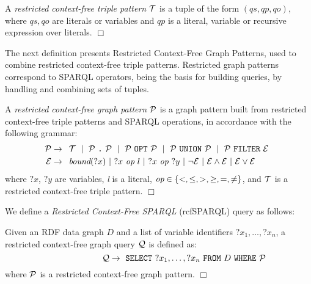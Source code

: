 \documentclass[runningheads]{llncs}
\begin{document}
\begin{definition}
A \textit{restricted con\-text-free triple pattern} ${\cal T}$ is a tuple of the form $(qs, qp, qo)$, where $qs, qo$ are literals or variables and $qp$ is a literal, variable or recursive expression over literals.
\hfill$\Box$
\end{definition}

The next definition presents Restricted Context-Free Graph Patterns, used to combine restricted context-free triple patterns.
Restricted graph patterns correspond to SPARQL operators, being the basis for building queries, by handling and combining sets of tuples.

\begin{definition}
A \textit{restricted con\-text-free graph pattern} ${\cal P}$ is a graph pattern built from restricted context-free triple patterns and SPARQL operations, in accordance with the following grammar:
\begin{align*} 
{\cal P} &\rightarrow
  \begin{array}[t]{l}
  {\cal T} \ \mid\  {\cal P}\  \texttt{.}\ {\cal P} \ \mid\    {\cal P}\ \texttt{OPT}\ {\cal P} \  \mid\  {\cal P}\ \texttt{UNION}\  {\cal P}\ \mid\  {\cal P}\   \texttt{FILTER}\ {\cal E}
  \end{array} \\
{\cal E} &\rightarrow
  \begin{array}[t]{l}
  \textit{bound}(?x)
  \ |\ ?x\ \textit{op}\ l
  \ |\ ?x\ \textit{op}\ ?y
  \ |\ \neg {\cal E}
  \ |\ {\cal E} \wedge {\cal E}
  \ |\ {\cal E} \vee {\cal E}
\end{array}
\end{align*}
where $?x$, $?y$ are variables, \textit{l} is a literal, $\textit{op} \in \{ <, \leq, >, \geq, =, \neq \}$, and ${\cal T}$ is a restricted context-free triple pattern. 
\hfill$\Box$
\end{definition}

We define a \emph{Restricted Context-Free SPARQL} (\textsf{rcfSPARQL}) query as follows:


\begin{definition}
Given an RDF data graph $D$ and a list of variable identifiers $?x_1, \dots, ?x_n$, a restricted context-free graph query ${\cal Q}$ is defined as:
$$ \qquad \qquad \qquad
{\cal Q} \rightarrow \ \texttt{SELECT}\ ?x_1, \dots, ?x_n\ \texttt{FROM}\ D\ \texttt{WHERE}\ {\cal P}
$$
where ${\cal P}$ is a restricted context-free graph pattern.
\hfill$\Box$
\end{definition}
\end{document}
